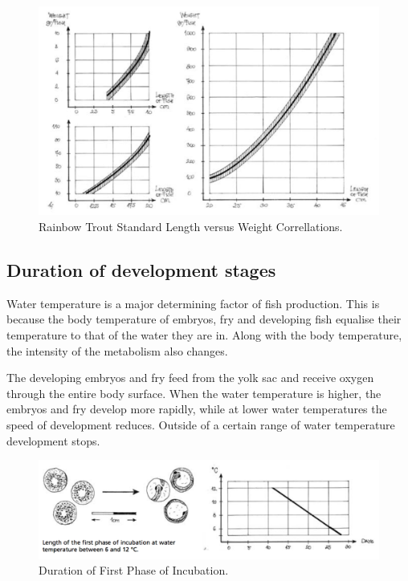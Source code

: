\begin{figure}[H]
   \centering
   \includegraphics[scale = 0.6]{images/LengthWeight.png}
    \caption{Rainbow Trout Standard Length versus Weight Correllations.}
   \label{fig:LengthWeight}
\end{figure}

\subsection{Duration of development stages}

Water temperature is a major determining factor of fish production. 
This is because the body temperature of embryos, fry and developing fish equalise 
their temperature to that of the water they are in. 
Along with the body temperature, the intensity of the metabolism also changes.

The developing embryos and fry feed from the yolk sac and receive oxygen through the entire body surface. When the water temperature is higher, the embryos and fry develop more rapidly, while at lower water temperatures the speed of development reduces. Outside of a certain range of water temperature development stops.

\begin{figure}[H]
   \centering
   \includegraphics[scale = 0.6]{images/DurationIncubationFirstPhase.png}
    \caption{Duration of First Phase of Incubation.}
   \label{fig:DurationIncubationFirstPhase}
\end{figure}

